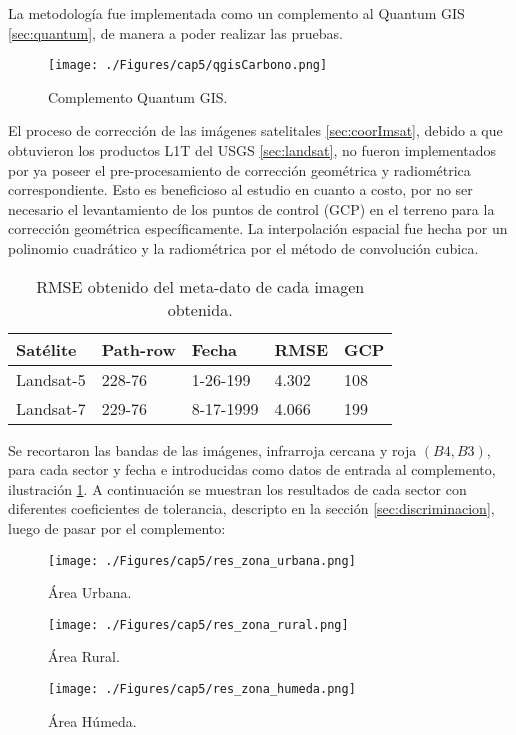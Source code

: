 La metodolog\'ia fue implementada como un complemento al Quantum GIS \ref{sec:quantum}, de manera a poder realizar las pruebas. 
\begin{figure}[H]
	\centering
	\texttt{[image: ./Figures/cap5/qgisCarbono.png]}
	\caption{Complemento Quantum GIS.}
	\label{fig:qgisC}
\end{figure}
El proceso de correcci\'on de las im\'agenes satelitales \ref{sec:coorImsat}, debido a que obtuvieron los productos L1T del USGS \ref{sec:landsat}, no fueron implementados por ya poseer el pre-procesamiento de correcci\'on geom\'etrica y radiom\'etrica correspondiente. Esto es beneficioso al estudio en cuanto a costo, por no ser necesario el levantamiento de los puntos de control (GCP) en el terreno para la correcci\'on geom\'etrica espec\'ificamente. La interpolaci\'on espacial fue hecha por un polinomio cuadr\'atico y la radiom\'etrica por el m\'etodo de convoluci\'on cubica.
\begin{table}[H]
	\centering

	\begin{tabular}{|l|l|l|l|l|}
		\hline
		\rowcolor[HTML]{EFEFEF} 
		\textbf{Sat\'elite} & \textbf{Path-row} & \textbf{Fecha} & \textbf{RMSE} & \textbf{GCP} \\ \hline
		Landsat-5         & 228-76            & 1-26-199       & 4.302         & 108          \\ \hline
		Landsat-7         & 229-76            & 8-17-1999      & 4.066         & 199          \\ \hline
	\end{tabular}
		\caption{RMSE obtenido del meta-dato de cada imagen obtenida.}
		\label{t:rmse}
\end{table}

Se recortaron las bandas de las im\'agenes, infrarroja cercana y roja $ (B4,B3) $, para cada sector y fecha e introducidas como datos de entrada al complemento, ilustraci\'on \ref{fig:qgisC}. A continuaci\'on se muestran los resultados de cada sector con diferentes coeficientes de tolerancia, descripto en la secci\'on \ref{sec:discriminacion}, luego de pasar por el complemento:
\begin{figure}[H]
	\centering
	\texttt{[image: ./Figures/cap5/res\_zona\_urbana.png]}
	\caption{\'Area Urbana.}
	\label{fig:ubana}
\end{figure}
\begin{figure}[H]
	\centering
	\texttt{[image: ./Figures/cap5/res\_zona\_rural.png]}
	\caption{\'Area Rural.}
	\label{fig:rural}
\end{figure}
\begin{figure}[H]
	\centering
	\texttt{[image: ./Figures/cap5/res\_zona\_humeda.png]}
	\caption{\'Area H\'umeda.}
	\label{fig:humeda}
\end{figure}

